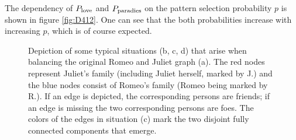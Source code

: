 \documentclass{scrartcl}
\begin{document}
The dependency of $P_{\mathrm{love}}$ and $P_{\mathrm{paradies}}$ on the pattern
selection probability $p$ is shown in figure \ref{fig:D412}. One can
see that the both probabilities increase with increasing $p$, which is
of course expected.





\begin{figure}
    \centering
    \def\svgwidth{0.9\textwidth}
    
    \caption{Depiction of some typical situations (b, c, d) that arise when
        balancing the original Romeo and Juliet graph (a). The red nodes
        represent Juliet's family (including Juliet herself, marked by J.) and
        the blue nodes consist of Romeo's family (Romeo being marked by
        R.). If an edge is depicted, the corresponding persons are friends;
        if an edge is missing the two corresponding persons are foes. The
        colors of the edges in situation (c) mark the two disjoint fully
        connected components that emerge.}
    \label{fig:D41}
\end{figure}
\end{document}
